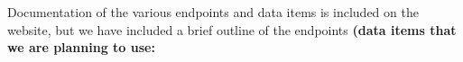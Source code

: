 \documentclass[11pt]{article}
\newcommand{\MYhref}[3][blue]{\href{#2}{\color{#1}{#3}}}%
\begin{document}

\pagebreak

\noindent 
Documentation of the various endpoints and data items is included on the \MYhref{https://covid19-docs.chrismichael.now.sh/}{Covid-19 API} website, but we have included a brief outline of the endpoints \textbf{(data items that we are planning to use:}
\end{document}
